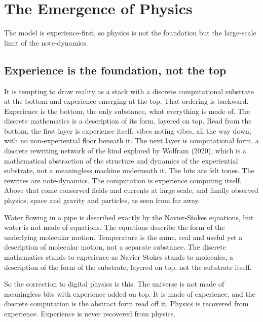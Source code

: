 \section{The Emergence of Physics}
\label{sec:physics}

The model is experience-first, so physics is not the foundation but the large-scale limit of the note-dynamics.

\subsection{Experience is the foundation, not the top}

It is tempting to draw reality as a stack with a discrete computational substrate at the bottom and experience emerging at the top. That ordering is backward. Experience is the bottom, the only substance, what everything is made of. The discrete mathematics is a description of its form, layered on top. Read from the bottom, the first layer is experience itself, vibes noting vibes, all the way down, with no non-experiential floor beneath it. The next layer is computational form, a discrete rewriting network of the kind explored by Wolfram (2020), which is a mathematical abstraction of the structure and dynamics of the experiential substrate, not a meaningless machine underneath it. The bits are felt tones. The rewrites are note-dynamics. The computation is experience computing itself. Above that come conserved fields and currents at large scale, and finally observed physics, space and gravity and particles, as seen from far away.

\begin{proposition}
Water flowing in a pipe is described exactly by the Navier-Stokes equations, but water is not made of equations. The equations describe the form of the underlying molecular motion. Temperature is the same, real and useful yet a description of molecular motion, not a separate substance. The discrete mathematics stands to experience as Navier-Stokes stands to molecules, a description of the form of the substrate, layered on top, not the substrate itself.
\end{proposition}

So the correction to digital physics is this. The universe is not made of meaningless bits with experience added on top. It is made of experience, and the discrete computation is the abstract form read off it. Physics is recovered from experience. Experience is never recovered from physics.

